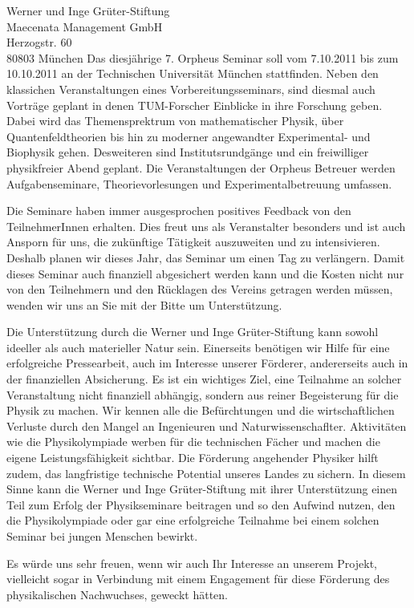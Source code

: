 \documentclass[../style/orpheus,fontsize=11pt]{scrlttr2}
\begin{document}
\begin{letter}{
\noindent Werner und Inge Gr\"uter-Stiftung \\
Maecenata Management GmbH \\
Herzogstr. 60\\
80803 M\"unchen
}
Das diesj\"ahrige 7. Orpheus Seminar soll vom 7.10.2011 bis zum 10.10.2011 an der Technischen Universit\"at M\"unchen stattfinden. Neben den klassichen Veranstaltungen eines Vorbereitungsseminars, sind diesmal auch Vortr\"age geplant in denen TUM-Forscher Einblicke in ihre Forschung geben. Dabei wird das Themensprektrum von mathematischer Physik, \"uber Quantenfeldtheorien bis hin zu moderner angewandter Experimental- und Biophysik gehen.  Desweiteren sind Institutsrundg\"ange und ein freiwilliger physikfreier Abend geplant.  Die Veranstaltungen der Orpheus Betreuer werden Aufgabenseminare, Theorievorlesungen und Experimentalbetreuung umfassen.  

Die Seminare haben immer ausgesprochen positives Feedback von den TeilnehmerInnen erhalten.  Dies freut uns als Veranstalter besonders und ist auch Ansporn f\"ur uns, die zuk\"unftige T\"atigkeit auszuweiten und zu intensivieren.  Deshalb planen wir dieses Jahr, das Seminar um einen Tag zu verl\"angern.  Damit dieses Seminar auch finanziell abgesichert werden kann und die Kosten nicht nur von den Teilnehmern und den R\"ucklagen des Vereins getragen werden m\"ussen, wenden wir uns an Sie mit der Bitte um Unterst\"utzung.

Die Unterst\"utzung durch die Werner und Inge Gr\"uter-Stiftung kann sowohl ideeller als auch materieller Natur sein.  Einerseits ben\"otigen wir Hilfe f\"ur eine erfolgreiche Pressearbeit, auch im Interesse unserer F\"orderer,  andererseits auch in der finanziellen Absicherung. Es ist ein wichtiges Ziel, eine Teilnahme an solcher Veranstaltung nicht finanziell abh\"angig, sondern aus reiner Begeisterung f\"ur die Physik zu machen. Wir kennen alle die Bef\"urchtungen und die wirtschaftlichen Verluste durch den Mangel an Ingenieuren und Naturwissenschaflter. Aktivit\"aten wie die Physikolympiade werben f\"ur die technischen F\"acher und machen die eigene Leistungsf\"ahigkeit sichtbar. Die F\"orderung angehender Physiker hilft zudem, das langfristige technische Potential unseres Landes zu sichern. In diesem Sinne kann die Werner und Inge Gr\"uter-Stiftung mit ihrer Unterst\"utzung einen Teil zum Erfolg der Physikseminare beitragen und so den Aufwind nutzen, den die Physikolympiade oder gar eine erfolgreiche Teilnahme bei einem solchen Seminar bei jungen Menschen bewirkt.

Es w\"urde uns sehr freuen, wenn wir auch Ihr Interesse an unserem Projekt, vielleicht sogar in Verbindung mit einem Engagement f\"ur diese F\"orderung des physikalischen Nachwuchses, geweckt h\"atten.


\end{letter}
\end{document}
